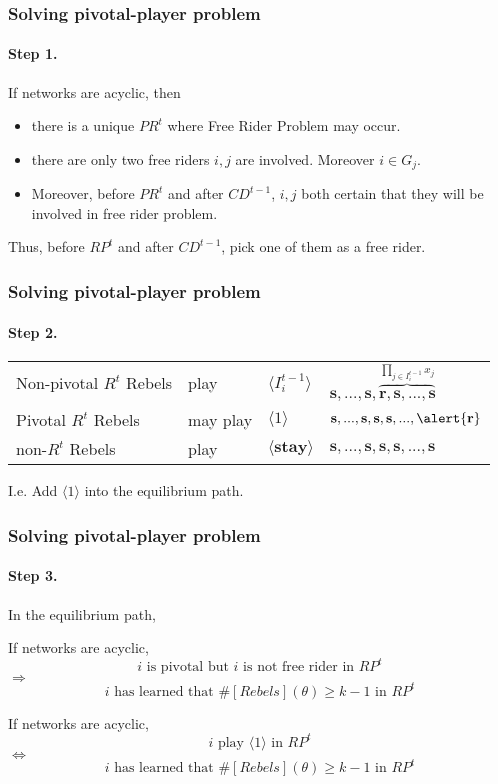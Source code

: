 \documentclass[9pt]{beamer}
\begin{document}
\begin{frame}
  \frametitle{Solving pivotal-player problem}
\framesubtitle{Step 1.}



\begin{lemma}
If networks are acyclic, then
\begin{itemize}
\item there is a \alert{unique} $PR^t$ where Free Rider Problem may occur. 
\item there are \alert{only two} free riders $i,j$ are involved. Moreover $i\in G_j$.
\item Moreover, \alert{before} $PR^t$ and \alert{after} $CD^{t-1}$, $i,j$ both certain that they will be involved in free rider problem.
\end{itemize}


\end{lemma}

\bigskip
Thus, {before} $RP^t$ and {after} $CD^{t-1}$, pick one of them as a free rider.


\end{frame}


\begin{frame}
  \frametitle{Solving pivotal-player problem}
\framesubtitle{Step 2.}

\begin{table}[h]
\begin{tabular}{l l l l}
Non-pivotal $R^t$ Rebels & play & $\langle I^{t-1}_i\rangle$ & $\textbf{s},...,\textbf{s},\overbrace{\textbf{r},\textbf{s},...,\textbf{s}}^{\prod_{j\in I^{t-1}_i}x_j}$ \\
Pivotal $R^t$ Rebels & \alert{may} play & \alert{$\langle 1\rangle$} & $\textbf{s},...,\textbf{s},\textbf{s},\textbf{s},...,\alert{\textbf{r}}$ \\
\hline
non-$R^t$ Rebels & play & $\langle \textbf{stay} \rangle$ & $\textbf{s},...,\textbf{s},\textbf{s},\textbf{s},...,\textbf{s}$  \\

\end{tabular}
\end{table}

I.e. Add \alert{$\langle 1\rangle$} into the equilibrium path.

\end{frame}

\begin{frame}
  \frametitle{Solving pivotal-player problem}
\framesubtitle{Step 3.}

In the equilibrium path,  
\begin{lemma}
If networks are acyclic, 
\[\text{$i$ is pivotal but $i$ is not free rider in $RP^t$}\] $\Rightarrow$  \[ \text{$i$ has learned that $\#[Rebels](\theta)\geq k-1$ in $RP^t$}\] 
\end{lemma}

\begin{lemma}
If networks are acyclic, 
\[\text{$i$ play $\langle 1 \rangle$ in $RP^t$}\] $\Leftrightarrow$  \[ \text{$i$ has learned that $\#[Rebels](\theta)\geq k-1$ in $RP^t$}\] 
\end{lemma}




\end{frame}
\end{document}
